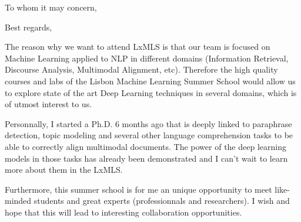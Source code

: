\documentclass[11pt,a4paper,sans]{moderncv}        %
\begin{document}
\clearpage
\date{April 8, 2015}
\opening{To whom it may concern,}
\closing{Best regards,}
\makelettertitle

The reason why we want to attend LxMLS is that our team is focused on
Machine Learning applied to NLP in different domains (Information
Retrieval, Discourse Analysis, Multimodal Alignment, etc). Therefore
the high quality courses and labs of the Lisbon Machine Learning
Summer School would allow us to explore state of the art Deep Learning
techniques in several domains, which is of utmost interest to us.

Personnally, I started a Ph.D. 6 months ago that is deeply linked to
paraphrase detection, topic modeling and several other language
comprehension tasks to be able to correctly align multimodal
documents. The power of the deep learning models in those tasks has
already been demonstrated and I can't wait to learn more about them in
the LxMLS.

Furthermore, this summer school is for me an unique opportunity to
meet like-minded students and great experts (professionnals and
researchers). I wish and hope that this will lead to interesting
collaboration opportunities.

\makeletterclosing

\end{document}
